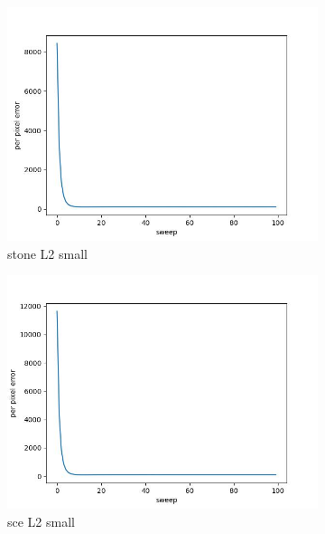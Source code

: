 \documentclass[11pt]{article}
\begin{document}
\begin{figure}[ht!]
    \centering
    \hfill%
    \begin{subfigure}[]{0.333\linewidth}
        \centering
        \includegraphics[width=\linewidth]{fig/loss/stone_L2_small_loss.jpg}
        \caption{stone L2 small}
    \end{subfigure}%
    \hfill%
    \begin{subfigure}[]{0.333\linewidth}
        \centering
        \includegraphics[width=\linewidth]{fig/loss/sce_L2_small_loss.jpg}
        \caption{sce L2 small}
    \end{subfigure}%
    \hfill%
    \begin{subfigure}[]{0.333\linewidth}
        \centering

\end{subfigure}
\end{figure}
\end{document}
